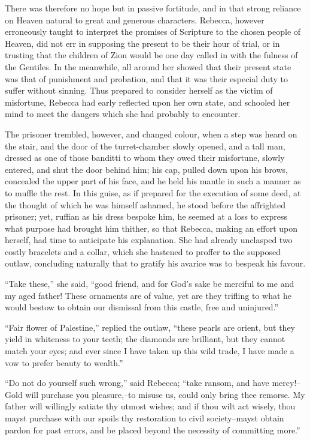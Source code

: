 There was therefore no hope but in passive fortitude, and in that strong
reliance on Heaven natural to great and generous characters. Rebecca,
however erroneously taught to interpret the promises of Scripture to the
chosen people of Heaven, did not err in supposing the present to be
their hour of trial, or in trusting that the children of Zion would be
one day called in with the fulness of the Gentiles. In the meanwhile,
all around her showed that their present state was that of punishment
and probation, and that it was their especial duty to suffer without
sinning. Thus prepared to consider herself as the victim of misfortune,
Rebecca had early reflected upon her own state, and schooled her mind to
meet the dangers which she had probably to encounter.

The prisoner trembled, however, and changed colour, when a step was
heard on the stair, and the door of the turret-chamber slowly opened,
and a tall man, dressed as one of those banditti to whom they owed their
misfortune, slowly entered, and shut the door behind him; his cap,
pulled down upon his brows, concealed the upper part of his face, and he
held his mantle in such a manner as to muffle the rest. In this guise,
as if prepared for the execution of some deed, at the thought of which
he was himself ashamed, he stood before the affrighted prisoner; yet,
ruffian as his dress bespoke him, he seemed at a loss to express what
purpose had brought him thither, so that Rebecca, making an effort upon
herself, had time to anticipate his explanation. She had already
unclasped two costly bracelets and a collar, which she hastened to
proffer to the supposed outlaw, concluding naturally that to gratify his
avarice was to bespeak his favour.

``Take these,'' she said, ``good friend, and for God's sake be merciful
to me and my aged father! These ornaments are of value, yet are they
trifling to what he would bestow to obtain our dismissal from this
castle, free and uninjured.''

``Fair flower of Palestine,'' replied the outlaw, ``these pearls are
orient, but they yield in whiteness to your teeth; the diamonds are
brilliant, but they cannot match your eyes; and ever since I have taken
up this wild trade, I have made a vow to prefer beauty to wealth.''

``Do not do yourself such wrong,'' said Rebecca; ``take ransom, and have
mercy!--Gold will purchase you pleasure,--to misuse us, could only bring
thee remorse. My father will willingly satiate thy utmost wishes; and if
thou wilt act wisely, thou mayst purchase with our spoils thy
restoration to civil society--mayst obtain pardon for past errors, and
be placed beyond the necessity of committing more.''

